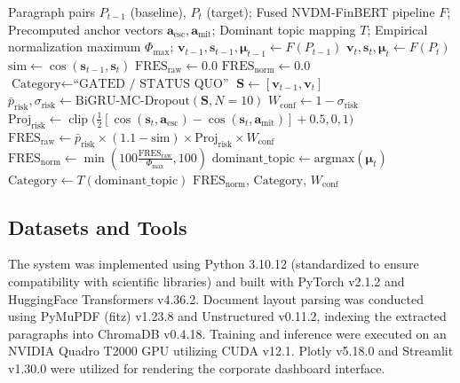 \documentclass[journal]{IEEEtran}
\begin{document}
\begin{algorithm}[h]
\caption{FRES Scoring and Topic-Taxonomy Routing}
\begin{algorithmic}[1]
\REQUIRE Paragraph pairs $P_{t-1}$ (baseline), $P_t$ (target);
\REQUIRE Fused NVDM-FinBERT pipeline $F$;
\REQUIRE Precomputed anchor vectors $\mathbf{a}_{\text{esc}}, \mathbf{a}_{\text{mit}}$;
\REQUIRE Dominant topic mapping $T$;
\REQUIRE Empirical normalization maximum $\Phi_{\text{max}}$;
\STATE $\mathbf{v}_{t-1}, \mathbf{s}_{t-1}, \boldsymbol{\mu}_{t-1} \leftarrow F(P_{t-1})$
\STATE $\mathbf{v}_t, \mathbf{s}_t, \boldsymbol{\mu}_t \leftarrow F(P_t)$
\STATE $\text{sim} \leftarrow \cos(\mathbf{s}_{t-1}, \mathbf{s}_t)$
    \STATE $\text{FRES}_{\text{raw}} \leftarrow 0.0$
    \STATE $\text{FRES}_{\text{norm}} \leftarrow 0.0$
    \STATE $\text{Category} \leftarrow \text{``GATED / STATUS QUO''}$
\ELSE
    \STATE $\mathbf{S} \leftarrow [\mathbf{v}_{t-1}, \mathbf{v}_t]$
    \STATE $\bar{p}_{\text{risk}}, \sigma_{\text{risk}} \leftarrow \text{BiGRU-MC-Dropout}(\mathbf{S}, N=10)$
    \STATE $W_{\text{conf}} \leftarrow 1 - \sigma_{\text{risk}}$
    \STATE $\text{Proj}_{\text{risk}} \leftarrow \operatorname{clip}\big(\frac{1}{2}[\cos(\mathbf{s}_t, \mathbf{a}_{\text{esc}}) - \cos(\mathbf{s}_t, \mathbf{a}_{\text{mit}})] + 0.5, 0, 1\big)$
    \STATE $\text{FRES}_{\text{raw}} \leftarrow \bar{p}_{\text{risk}} \times (1.1 - \text{sim}) \times \text{Proj}_{\text{risk}} \times W_{\text{conf}}$
    \STATE $\text{FRES}_{\text{norm}} \leftarrow \min\left(100 \frac{\text{FRES}_{\text{raw}}}{\Phi_{\text{max}}}, 100\right)$
    \STATE $\text{dominant\_topic} \leftarrow \text{argmax}(\boldsymbol{\mu}_t)$
    \STATE $\text{Category} \leftarrow T(\text{dominant\_topic})$
\ENDIF
\RETURN $\text{FRES}_{\text{norm}}$, $\text{Category}$, $W_{\text{conf}}$
\end{algorithmic}
\end{algorithm}

\subsection{Datasets and Tools}
The system was implemented using Python 3.10.12 (standardized to ensure compatibility with scientific libraries) and built with PyTorch v2.1.2 and HuggingFace Transformers v4.36.2. Document layout parsing was conducted using PyMuPDF (fitz) v1.23.8 and Unstructured v0.11.2, indexing the extracted paragraphs into ChromaDB v0.4.18. Training and inference were executed on an NVIDIA Quadro T2000 GPU utilizing CUDA v12.1. Plotly v5.18.0 and Streamlit v1.30.0 were utilized for rendering the corporate dashboard interface.
\end{document}
